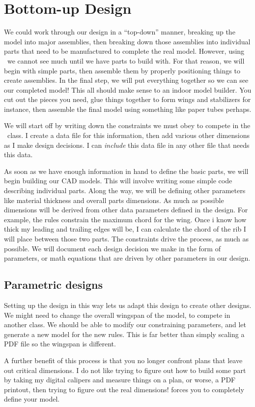 \section{Bottom-up Design}

We could work through our design in a ``top-down'' manner, breaking up the model
into major assemblies, then breaking down those assemblies into individual parts
that need to be manufactured to complete the real model. However, using \osc\ we
cannot see much until we have parts  to build with. For that reason, we will
begin with simple parts, then assemble them by properly positioning things to
create assemblies. In the final step, we will put everything together so we can
see our completed model! This all should make sense to an indoor model builder.
You cut out the pieces you need, glue things together to form wings and
stabilizers for instance, then assemble the final model using something like
paper tubes perhaps.

We will start off by writing down the constraints we must obey to compete in the
\LPP\ class. I create a data file for this information, then add various other
dimensions as I make design decisions. I can {\it include} this data file in any
other file that needs this data.

As soon as we have enough information in hand to define the basic parts, we will
begin building our CAD models. This will involve writing some simple code
describing individual parts. Along the way, we will be defining other parameters
like material thickness and overall parts dimensions.  As much as possible
dimensions will be derived from other data parameters defined in the design. For
example, the rules constrain the maximum chord for the wing. Once i know how
thick my leading and trailing edges will be, I can calculate the chord of the
rib I will place between those two parts. The constraints drive the process, as
much as possible. We will document each design decision we make in the form of
parameters, or math equations that are driven by other parameters in our design.

\subsection{Parametric designs}

Setting up the design in this way lets us adapt this design to create other
designs. We might need to change the overall wingspan of the model, to compete
in another class. We should be able to modify our constraining parameters, and
let \osc generate a new model for the new rules. This is far better than simply
scaling a PDF file so the wingspan is different.

A further benefit of this process is that you no longer confront plans that
leave out critical dimensions. I do not like trying to figure out how to build
some part by taking my digital calipers and measure things on a plan, or worse,
a  PDF printout, then trying to figure out the real dimensions! \osc forces you
to completely define your model.

